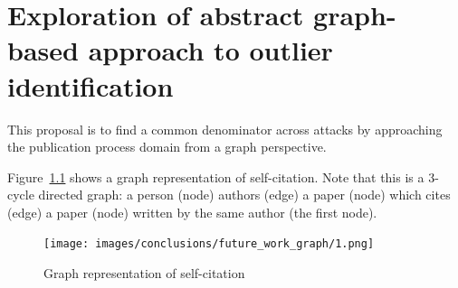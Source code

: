 \documentclass{ou-report}
\newcommand{\outline}[1]{{\color{blue} #1}}
\begin{document}






\chapter{Exploration of abstract graph-based approach to outlier identification}
\label{chp:graph_based_approach}

This proposal is to find a common denominator across attacks by approaching the 
publication process domain from a graph perspective.

Figure~\ref{fig:graph_1} shows a graph representation of self-citation.
Note that this is a 3-cycle directed graph: a person (node) authors (edge) a 
paper (node) which cites (edge) a paper (node) written by the same author (the 
first node).

\begin{figure}[H]
    \centering
    \texttt{[image: images/conclusions/future\_work\_graph/1.png]}
    \caption{Graph representation of self-citation}
    \label{fig:graph_1}
\end{figure}
\end{document}
